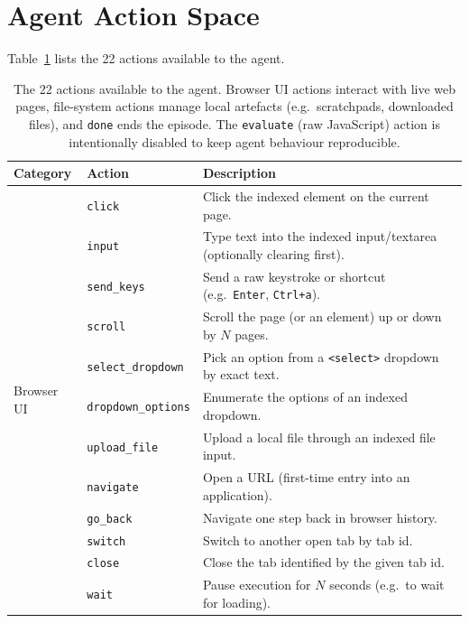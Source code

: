 \section{Agent Action Space}
\label{app:actions}

Table~\ref{tab:actions} lists the 22 actions available to the \datasetname agent.

\begin{table}[h]
\centering
\small
\caption{The 22 actions available to the \datasetname agent. Browser UI actions interact with live web pages, file-system actions manage local artefacts (e.g.\ scratchpads, downloaded files), and \texttt{done} ends the episode. The \texttt{evaluate} (raw JavaScript) action is intentionally disabled to keep agent behaviour reproducible.}
\label{tab:actions}
\vspace{1em}
\setlength{\tabcolsep}{6pt}
\renewcommand{\arraystretch}{1.15}
\begin{tabular}{l l p{8cm}}
\toprule
\textbf{Category} & \textbf{Action} & \textbf{Description} \\
\midrule
\multirow{18}{*}{Browser UI}
  & \texttt{click}             & Click the indexed element on the current page. \\
  & \texttt{input}             & Type text into the indexed input/textarea (optionally clearing first). \\
  & \texttt{send\_keys}        & Send a raw keystroke or shortcut (e.g.\ \texttt{Enter}, \texttt{Ctrl+a}). \\
  & \texttt{scroll}            & Scroll the page (or an element) up or down by $N$ pages. \\
  & \texttt{select\_dropdown}  & Pick an option from a \texttt{<select>} dropdown by exact text. \\
  & \texttt{dropdown\_options} & Enumerate the options of an indexed dropdown. \\
  & \texttt{upload\_file}      & Upload a local file through an indexed file input. \\
  & \texttt{navigate}          & Open a URL (first-time entry into an application). \\
  & \texttt{go\_back}          & Navigate one step back in browser history. \\
  & \texttt{switch}            & Switch to another open tab by tab id. \\
  & \texttt{close}             & Close the tab identified by the given tab id. \\
  & \texttt{wait}              & Pause execution for $N$ seconds (e.g.\ to wait for loading). \\

\end{tabular}
\end{table}
